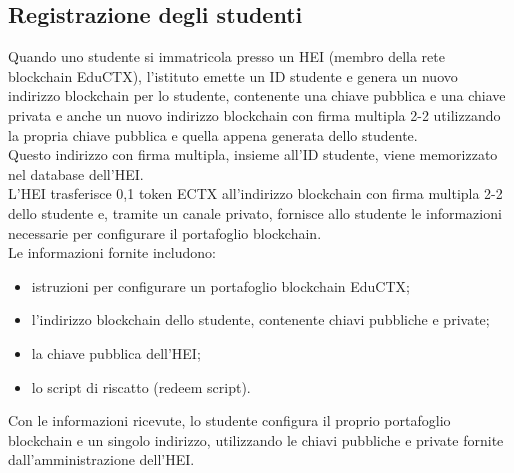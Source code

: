 \subsection{Registrazione degli studenti}
Quando uno studente si immatricola presso un HEI (membro della rete blockchain EduCTX), l'istituto emette un ID studente e genera un nuovo indirizzo blockchain per lo studente, contenente una chiave pubblica e una chiave privata
e anche un nuovo indirizzo blockchain con firma multipla 2-2 utilizzando la propria chiave pubblica e quella appena generata dello studente. 
\\Questo indirizzo con firma multipla, insieme all'ID studente, viene memorizzato nel database dell'HEI.
\\L'HEI trasferisce 0,1 token ECTX all'indirizzo blockchain con firma multipla 2-2 dello studente e, tramite un canale privato, fornisce allo studente le informazioni necessarie per configurare il portafoglio blockchain. 
\\Le informazioni fornite includono:
\begin{itemize}
    \item istruzioni per configurare un portafoglio blockchain EduCTX;
    \item l'indirizzo blockchain dello studente, contenente chiavi pubbliche e private;
    \item la chiave pubblica dell'HEI;
    \item lo script di riscatto (redeem script).
\end{itemize}
Con le informazioni ricevute, lo studente configura il proprio portafoglio blockchain e un singolo indirizzo, utilizzando le chiavi pubbliche e private fornite dall'amministrazione dell'HEI.

